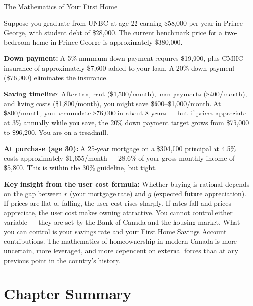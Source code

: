 \begin{everydaylife}{The Mathematics of Your First Home}

Suppose you graduate from UNBC at age 22 earning \$58{,}000 per year in
Prince George, with student debt of \$28{,}000. The current benchmark price
for a two-bedroom home in Prince George is approximately \$380{,}000.

\textbf{Down payment:} A 5\% minimum down payment requires \$19{,}000,
plus CMHC insurance of approximately \$7{,}600 added to your loan.
A 20\% down payment (\$76{,}000) eliminates the insurance.

\textbf{Saving timeline:} After tax, rent (\$1{,}500/month), loan payments
(\$400/month), and living costs (\$1{,}800/month), you might save
\$600--\$1{,}000/month. At \$800/month, you accumulate \$76{,}000 in about
8 years --- but if prices appreciate at 3\% annually while you save, the
20\% down payment target grows from \$76{,}000 to \$96{,}200. You are on
a treadmill.

\textbf{At purchase (age 30):} A 25-year mortgage on a \$304{,}000 principal
at 4.5\% costs approximately \$1{,}655/month --- 28.6\% of your gross monthly
income of \$5{,}800. This is within the 30\% guideline, but tight.

\textbf{Key insight from the user cost formula:} Whether buying is rational
depends on the gap between $r$ (your mortgage rate) and $g$ (expected future
appreciation). If prices are flat or falling, the user cost rises sharply.
If rates fall and prices appreciate, the user cost makes owning attractive.
You cannot control either variable --- they are set by the Bank of Canada
and the housing market. What you can control is your savings rate and your
First Home Savings Account contributions. The mathematics of homeownership
in modern Canada is more uncertain, more leveraged, and more dependent on
external forces than at any previous point in the country's history.
\end{everydaylife}

\section*{Chapter Summary}

